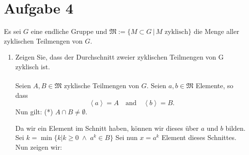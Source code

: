 \documentclass[11pt,a4paper,ngerman]{article}
\begin{document}
\section*{Aufgabe 4}
Es sei $G$ eine endliche Gruppe und $\mathfrak{M} := \{ M \subset G \, | \, M \text{ zyklisch} \}$ die Menge aller zyklischen Teilmengen von $G$.
\begin{enumerate}[\bfseries a)]
\item Zeigen Sie, dass der Durchschnitt zweier zyklischen Teilmengen von G zyklisch ist. \\ \\
Seien $A,B \in \mathfrak{M}$ zyklische Teilmengen von $G$.
Seien $a,b\in \mathfrak{M}$ Elemente, so dass
$$
\left< a \right> = A \quad \text{and} \quad \left< b \right> = B.
$$
Nun gilt: (*) $A \cap B \not= \emptyset$.

Da wir ein Element im Schnitt haben, können wir dieses über $a$ und $b$ bilden.\\
Sei $k = {\min \{k | k\geq 0 \; \land \; a^k \in B\}}$
Sei nun $x = a^k$ Element dieses Schnittes. Nun zeigen wir:

\end{enumerate}
\end{document}
